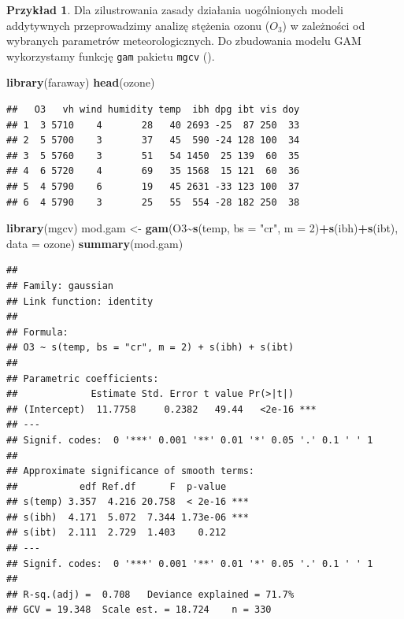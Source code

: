\documentclass[
]{book}
\newenvironment{Shaded}{\begin{snugshade}}{\end{snugshade}}
\newcommand{\AttributeTok}[1]{\textcolor[rgb]{0.13,0.29,0.53}{#1}}
\newcommand{\DecValTok}[1]{\textcolor[rgb]{0.00,0.00,0.81}{#1}}
\newcommand{\FunctionTok}[1]{\textcolor[rgb]{0.13,0.29,0.53}{\textbf{#1}}}
\newcommand{\NormalTok}[1]{#1}
\newcommand{\OtherTok}[1]{\textcolor[rgb]{0.56,0.35,0.01}{#1}}
\newcommand{\SpecialCharTok}[1]{\textcolor[rgb]{0.81,0.36,0.00}{\textbf{#1}}}
\newcommand{\StringTok}[1]{\textcolor[rgb]{0.31,0.60,0.02}{#1}}
\theoremstyle{plain}
\theoremstyle{definition}
\theoremstyle{definition}
\theoremstyle{definition}
\newtheorem{example}{Przykład}[chapter]
\theoremstyle{definition}
\theoremstyle{definition}
\theoremstyle{remark}
\begin{document}
\begin{example}
\protect\hypertarget{exm:gam}{}\label{exm:gam}Dla zilustrowania zasady działania uogólnionych modeli addytywnych przeprowadzimy analizę stężenia ozonu (\(O_3\)) w zależności od wybranych parametrów meteorologicznych. Do zbudowania modelu GAM wykorzystamy funkcję \texttt{gam} pakietu \texttt{mgcv} ().
\end{example}

\begin{Shaded}
\begin{Highlighting}[]
\FunctionTok{library}\NormalTok{(faraway)}
\FunctionTok{head}\NormalTok{(ozone)}
\end{Highlighting}
\end{Shaded}

\begin{verbatim}
##   O3   vh wind humidity temp  ibh dpg ibt vis doy
## 1  3 5710    4       28   40 2693 -25  87 250  33
## 2  5 5700    3       37   45  590 -24 128 100  34
## 3  5 5760    3       51   54 1450  25 139  60  35
## 4  6 5720    4       69   35 1568  15 121  60  36
## 5  4 5790    6       19   45 2631 -33 123 100  37
## 6  4 5790    3       25   55  554 -28 182 250  38
\end{verbatim}

\begin{Shaded}
\begin{Highlighting}[]
\FunctionTok{library}\NormalTok{(mgcv)}
\NormalTok{mod.gam }\OtherTok{\textless{}{-}} \FunctionTok{gam}\NormalTok{(O3}\SpecialCharTok{\textasciitilde{}}\FunctionTok{s}\NormalTok{(temp, }\AttributeTok{bs =} \StringTok{"cr"}\NormalTok{, }\AttributeTok{m =} \DecValTok{2}\NormalTok{)}\SpecialCharTok{+}\FunctionTok{s}\NormalTok{(ibh)}\SpecialCharTok{+}\FunctionTok{s}\NormalTok{(ibt), }\AttributeTok{data =}\NormalTok{ ozone)}
\FunctionTok{summary}\NormalTok{(mod.gam)}
\end{Highlighting}
\end{Shaded}

\begin{verbatim}
## 
## Family: gaussian 
## Link function: identity 
## 
## Formula:
## O3 ~ s(temp, bs = "cr", m = 2) + s(ibh) + s(ibt)
## 
## Parametric coefficients:
##             Estimate Std. Error t value Pr(>|t|)    
## (Intercept)  11.7758     0.2382   49.44   <2e-16 ***
## ---
## Signif. codes:  0 '***' 0.001 '**' 0.01 '*' 0.05 '.' 0.1 ' ' 1
## 
## Approximate significance of smooth terms:
##           edf Ref.df      F  p-value    
## s(temp) 3.357  4.216 20.758  < 2e-16 ***
## s(ibh)  4.171  5.072  7.344 1.73e-06 ***
## s(ibt)  2.111  2.729  1.403    0.212    
## ---
## Signif. codes:  0 '***' 0.001 '**' 0.01 '*' 0.05 '.' 0.1 ' ' 1
## 
## R-sq.(adj) =  0.708   Deviance explained = 71.7%
## GCV = 19.348  Scale est. = 18.724    n = 330
\end{verbatim}
\end{document}
